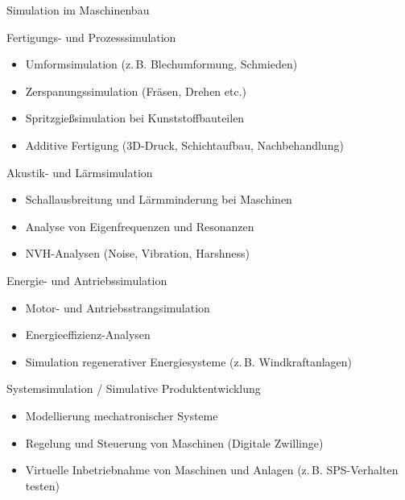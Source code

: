 \documentclass[xelatex,aspectratio=169]{beamer}
\begin{document}
\begin{frame}[allowframebreaks]{Simulation im Maschinenbau}
    \begin{block}{Fertigungs- und Prozesssimulation}
        \begin{itemize}
            \item Umformsimulation (z.\,B. Blechumformung, Schmieden)
            \item Zerspanungssimulation (Fräsen, Drehen etc.)
            \item Spritzgießsimulation bei Kunststoffbauteilen
            \item Additive Fertigung (3D-Druck, Schichtaufbau, Nachbehandlung)
        \end{itemize}
    \end{block}

    \begin{block}{Akustik- und Lärmsimulation}
        \begin{itemize}
            \item Schallausbreitung und Lärmminderung bei Maschinen
            \item Analyse von Eigenfrequenzen und Resonanzen
            \item NVH-Analysen (Noise, Vibration, Harshness)
        \end{itemize}
    \end{block}

    \begin{block}{Energie- und Antriebssimulation}
        \begin{itemize}
            \item Motor- und Antriebsstrangsimulation
            \item Energieeffizienz-Analysen
            \item Simulation regenerativer Energiesysteme (z.\,B. Windkraftanlagen)
        \end{itemize}
    \end{block}

    \begin{block}{Systemsimulation / Simulative Produktentwicklung}
        \begin{itemize}
            \item Modellierung mechatronischer Systeme
            \item Regelung und Steuerung von Maschinen (Digitale Zwillinge)
            \item Virtuelle Inbetriebnahme von Maschinen und Anlagen (z.\,B. SPS-Verhalten testen)
        \end{itemize}
    \end{block}


\end{frame}
\end{document}
